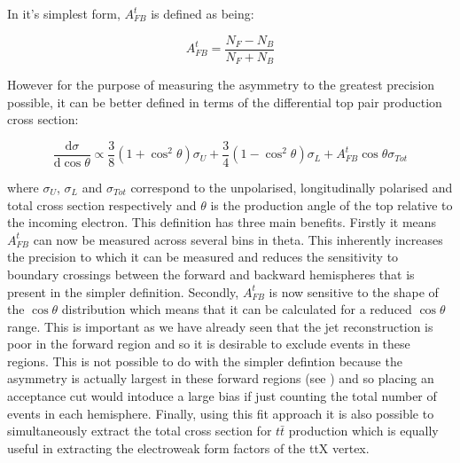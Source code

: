 In it's simplest form, $A_{FB}^t$ is defined as being:

\begin{equation}
A_{FB}^t=\frac{N_F-N_B}{N_F+N_B}
\end{equation}

However for the purpose of measuring the asymmetry to the greatest precision possible, it can be better defined in terms of the differential top pair production cross section:

\begin{equation}
  \label{eq:afbfit}
\frac{\mathrm{d}\sigma}{\mathrm{d}\cos\theta} \propto \frac{3}{8}(1+\cos^{2}\theta)\sigma_{U} + \frac{3}{4}(1-\cos^{2}\theta)\sigma_{L} + A_{FB}^{t}\cos\theta\sigma_{Tot}
\end{equation}

where $\sigma_U$, $\sigma_L$ and $\sigma_{Tot}$ correspond to the unpolarised, longitudinally polarised and total cross section respectively and $\theta$ is the production angle of the top relative to the incoming electron\cite{PhysRevD.25.1218}. This definition has three main benefits. Firstly it means $A_{FB}^t$ can now be measured across several bins in theta. This inherently increases the precision to which it can be measured and reduces the sensitivity to boundary crossings between the forward and backward hemispheres that is present in the simpler definition. Secondly, $A_{FB}^t$ is now sensitive to the shape of the $\cos\theta$ distribution which means that it can be calculated for a reduced $\cos\theta$ range. This is important as we have already seen that the jet reconstruction is poor in the forward region and so it is desirable to exclude events in these regions. This is not possible to do with the simpler defintion because the asymmetry is actually largest in these forward regions (see ) and so placing an acceptance cut would intoduce a large bias if just counting the total number of events in each hemisphere. Finally, using this fit approach it is also possible to simultaneously extract the total cross section for $t\bar{t}$ production which is equally useful in extracting the electroweak form factors of the ttX vertex.

